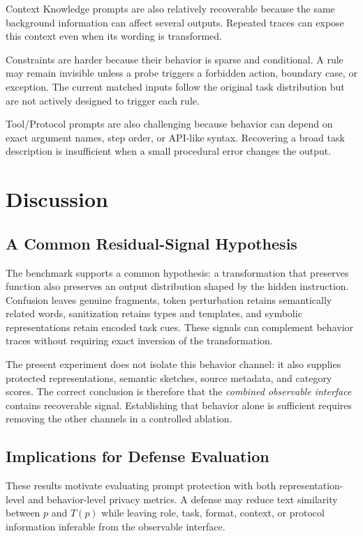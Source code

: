 \documentclass[letterpaper]{article} %
\begin{document}
Context Knowledge prompts are also relatively recoverable because the same background information can affect several outputs.  Repeated traces can expose this context even when its wording is transformed.

Constraints are harder because their behavior is sparse and conditional.  A rule may remain invisible unless a probe triggers a forbidden action, boundary case, or exception.  The current matched inputs follow the original task distribution but are not actively designed to trigger each rule.

Tool/Protocol prompts are also challenging because behavior can depend on exact argument names, step order, or API-like syntax.  Recovering a broad task description is insufficient when a small procedural error changes the output.

\section{Discussion}

\subsection{A Common Residual-Signal Hypothesis}

The benchmark supports a common hypothesis: a transformation that preserves function also preserves an output distribution shaped by the hidden instruction.  Confusion leaves genuine fragments, token perturbation retains semantically related words, sanitization retains types and templates, and symbolic representations retain encoded task cues.  These signals can complement behavior traces without requiring exact inversion of the transformation.

The present experiment does not isolate this behavior channel: it also supplies protected representations, semantic sketches, source metadata, and category scores.  The correct conclusion is therefore that the \emph{combined observable interface} contains recoverable signal.  Establishing that behavior alone is sufficient requires removing the other channels in a controlled ablation.

\subsection{Implications for Defense Evaluation}

These results motivate evaluating prompt protection with both representation-level and behavior-level privacy metrics.  A defense may reduce text similarity between \(p\) and \(T(p)\) while leaving role, task, format, context, or protocol information inferable from the observable interface.
\end{document}

